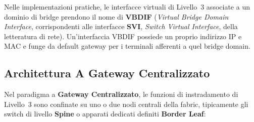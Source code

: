 \documentclass[11pt, a4paper]{article}
\begin{document}

Nelle implementazioni pratiche, le interfacce virtuali di Livello~3 associate a un dominio di bridge prendono il nome di \textbf{VBDIF} (\emph{Virtual Bridge Domain Interface}, corrispondenti alle interfacce \textbf{SVI}, \emph{Switch Virtual Interface}, della letteratura di rete). Un'interfaccia VBDIF possiede un proprio indirizzo IP e MAC e funge da default gateway per i terminali afferenti a quel bridge domain.

\subsection{Architettura A Gateway Centralizzato}

Nel paradigma a \textbf{Gateway Centralizzato}, le funzioni di instradamento di Livello~3 sono confinate su uno o due nodi centrali della fabric, tipicamente gli switch di livello \textbf{Spine} o apparati dedicati definiti \textbf{Border Leaf}:

\end{document}
